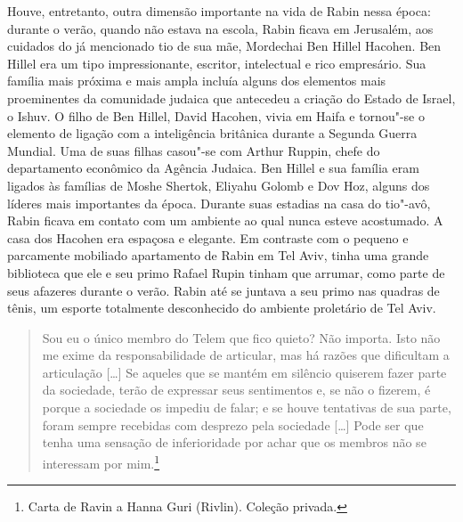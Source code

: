 Houve, entretanto, outra dimensão importante na vida de Rabin nessa
época: durante o verão, quando não estava na escola, Rabin ficava em
Jerusalém, aos cuidados do já mencionado tio de sua mãe, Mordechai Ben Hillel Hacohen.
Ben Hillel era um tipo impressionante, escritor, intelectual e rico
empresário. Sua família mais próxima e mais ampla incluía alguns dos
elementos mais proeminentes da comunidade judaica que antecedeu a
criação do Estado de Israel, o Ishuv. O filho de Ben Hillel, David
Hacohen, vivia em Haifa e tornou"-se o elemento de ligação com a
inteligência britânica durante a Segunda Guerra Mundial. Uma de suas
filhas casou"-se com Arthur Ruppin, chefe do departamento econômico da
Agência Judaica. Ben Hillel e sua família eram ligados às famílias de
Moshe Shertok, Eliyahu Golomb e Dov Hoz, alguns dos líderes mais
importantes da época. Durante suas estadias na casa do tio"-avô, Rabin ficava
em contato com um ambiente ao qual nunca esteve acostumado. A casa dos
Hacohen era espaçosa e elegante. Em contraste com o pequeno e parcamente
mobiliado apartamento de Rabin em Tel Aviv, tinha uma grande biblioteca
que ele e seu primo Rafael Rupin tinham que arrumar, como parte de
seus afazeres durante o verão. Rabin até se juntava a seu primo nas
quadras de tênis, um esporte totalmente desconhecido do ambiente
proletário de Tel Aviv.


\begin{quote}
Sou eu o único membro
do Telem que fico quieto? Não importa. Isto não me exime da
responsabilidade de articular, mas há razões que dificultam a
articulação {[}\ldots{}{]} Se aqueles que se mantém em silêncio quiserem fazer parte
da sociedade, terão de expressar seus sentimentos e, se não o fizerem,
é porque a sociedade os impediu de falar; e se houve tentativas de sua
parte, foram sempre recebidas com desprezo pela sociedade {[}\ldots{}{]} Pode ser
que tenha uma sensação de inferioridade por achar que os membros não se
interessam por mim.\footnote{Carta de Ravin a Hanna Guri (Rivlin). Coleção privada.}
\end{quote}

